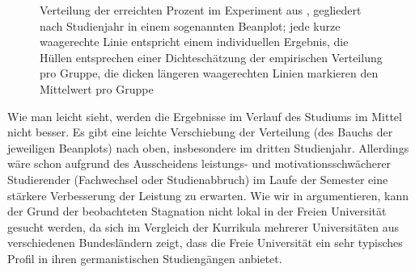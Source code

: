 \begin{figure}[htpb]
  \centering
  \caption{Verteilung der erreichten Prozent im Experiment aus \citet{SchaeferSayatz2017a}, gegliedert nach Studienjahr in einem sogenannten Beanplot; jede kurze waagerechte Linie entspricht einem individuellen Ergebnis, die Hüllen entsprechen einer Dichteschätzung der empirischen Verteilung pro Gruppe, die dicken längeren waagerechten Linien markieren den Mittelwert pro Gruppe}
  \label{fig:grammatikkentnissevonstudierenden002}
\end{figure}

\Np

Wie man leicht sieht, werden die Ergebnisse im Verlauf des Studiums im Mittel nicht besser.
Es gibt eine leichte Verschiebung der Verteilung (des Bauchs der jeweiligen Beanplots) nach oben, insbesondere im dritten Studienjahr.
Allerdings wäre schon aufgrund des Ausscheidens leistungs- und motivationsschwächerer Studierender (Fachwechsel oder Studienabbruch) im Laufe der Semester eine stärkere Verbesserung der Leistung zu erwarten.
Wie wir in \citet[242--243]{SchaeferSayatz2017a} argumentieren, kann der Grund der beobachteten Stagnation nicht lokal in der Freien Universität gesucht werden, da sich im Vergleich der Kurrikula mehrerer Universitäten aus verschiedenen Bundesländern zeigt, dass die Freie Universität ein sehr typisches Profil in ihren germanistischen Studiengängen anbietet.

